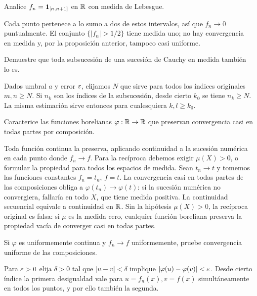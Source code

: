 \begin{ejercicio}\label{ej:v2-l15-3}
Analice $f_n=\mathbf1_{[n,n+1]}$ en $\mathbb R$ con medida de Lebesgue.
\end{ejercicio}
\begin{solucion}
Cada punto pertenece a lo sumo a dos de estos intervalos, así que $f_n\to0$ puntualmente. El conjunto $\{|f_n|>1/2\}$ tiene medida uno; no hay convergencia en medida y, por la proposición anterior, tampoco casi uniforme.
\end{solucion}

\begin{ejercicio}\label{ej:v2-l15-4}
Demuestre que toda subsucesión de una sucesión de Cauchy en medida también lo es.
\end{ejercicio}
\begin{solucion}
Dados umbral $a$ y error $\varepsilon$, elijamos $N$ que sirve para todos los índices originales $m,n\ge N$. Si $n_k$ son los índices de la subsucesión, desde cierto $k_0$ se tiene $n_k\ge N$. La misma estimación sirve entonces para cualesquiera $k,l\ge k_0$.
\end{solucion}

\begin{ejercicio}\label{ej:v2-l15-5}
Caracterice las funciones borelianas $\varphi:\mathbb R\to\mathbb R$ que preservan convergencia casi en todas partes por composición.
\end{ejercicio}
\begin{solucion}
Toda función continua la preserva, aplicando continuidad a la sucesión numérica en cada punto donde $f_n\to f$. Para la recíproca debemos exigir $\mu(X)>0$, o formular la propiedad para todos los espacios de medida. Sean $t_n\to t$ y tomemos las funciones constantes $f_n=t_n$, $f=t$. La convergencia casi en todas partes de las composiciones obliga a $\varphi(t_n)\to\varphi(t)$: si la sucesión numérica no convergiera, fallaría en todo $X$, que tiene medida positiva. La continuidad secuencial equivale a continuidad en $\mathbb R$. Sin la hipótesis $\mu(X)>0$, la recíproca original es falsa: si $\mu$ es la medida cero, cualquier función boreliana preserva la propiedad vacía de converger casi en todas partes.
\end{solucion}

\begin{ejercicio}\label{ej:v2-l15-6}
Si $\varphi$ es uniformemente continua y $f_n\to f$ uniformemente, pruebe convergencia uniforme de las composiciones.
\end{ejercicio}
\begin{solucion}
Para $\varepsilon>0$ elija $\delta>0$ tal que $|u-v|<\delta$ implique $|\varphi(u)-\varphi(v)|<\varepsilon$. Desde cierto índice la primera desigualdad vale para $u=f_n(x),v=f(x)$ simultáneamente en todos los puntos, y por ello también la segunda.
\end{solucion}

